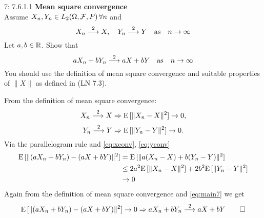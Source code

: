 \documentclass[a4paper,twoside=false,abstract=false,numbers=noenddot,
titlepage=false,headings=small,parskip=half,version=last]{scrartcl}
\begin{document}

\begin{exercise}{7: 7.6.1.1} \textbf{Mean square convergence}\\
    Assume $X_n, Y_n\in \text{$L_2$}(\Omega,\mathcal{F},P)\, \forall n$ and
    \begin{equation}
        X_n \stackrel{2}{\longrightarrow} X, \quad
        Y_n \stackrel{2}{\longrightarrow} Y \quad
        \text{as}\quad n\rightarrow\infty
    \end{equation}
    Let $a, b \in \mathbb{R}$. Show that
    \begin{equation}
        aX_n + bY_n\stackrel{2}{\longrightarrow} aX + bY\quad
        \text{as}\quad n\rightarrow\infty
    \end{equation}
    You should use the definition of mean square convergence and suitable
    properties of $\|X\|$ as defined in (LN 7.3).
\end{exercise}
\begin{solution}
    From the definition of mean square convergence:
    \begin{equation}
        \label{eq:xconv}
        X_n \stackrel{2}{\longrightarrow} X \Rightarrow
        {\rm E}\,[\|X_n-X\|^2] \rightarrow 0,
    \end{equation}
    \begin{equation}
        \label{eq:yconv}
        Y_n \stackrel{2}{\longrightarrow} Y \Rightarrow
        {\rm E}\,[\|Y_n-Y\|^2] \rightarrow 0.
    \end{equation}
    Via the parallelogram rule and \eqref{eq:xconv}, \eqref{eq:yconv}
    \begin{align}  %
        \label{eq:main7}
        \Expected[\|(aX_n+bY_n)-(aX+bY)\|^2] &=
        \Expected[\|a(X_n-X) + b(Y_n-Y)\|^2] \nonumber \\ &\le
        2a^2\Expected[\|X_n-X\|^2]+2b^2\Expected[\|Y_n-Y\|^2] \nonumber \\ &
        \rightarrow 0
    \end{align}
    Again from the definition of mean square convergence and
    \eqref{eq:main7} we get %
    \begin{equation}
        {\rm E}\,[\|(aX_n+bY_n)-(aX+bY)\|^2] \rightarrow 0 \Rightarrow
        aX_n+bY_n \stackrel{2}{\longrightarrow} aX+bY \qed
    \end{equation}
\end{solution}
\pagebreak

\end{document}
